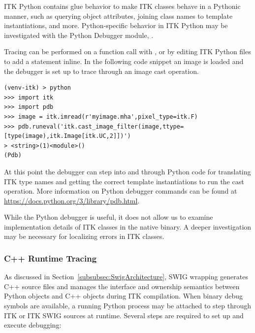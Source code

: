 ITK Python contains glue behavior to make ITK classes behave in a Pythonic manner,
such as querying object attributes, joining class names to template instantiations, and more.
Python-specific behavior in ITK Python may be investigated with the
Python Debugger module, .

Tracing can be performed on a function call with , or by editing ITK Python
files to add a  statement inline. In the following code snippet
an image is loaded and the debugger is set up to trace through an image cast operation.

\begin{verbatim}
(venv-itk) > python
>>> import itk
>>> import pdb
>>> image = itk.imread(r'myimage.mha',pixel_type=itk.F)
>>> pdb.runeval('itk.cast_image_filter(image,ttype=[type(image),itk.Image[itk.UC,2]])')
> <string>(1)<module>()
(Pdb)
\end{verbatim}

At this point the debugger can step into and through Python code for translating ITK
type names and getting the correct template instantiations to run the cast operation. More
information on Python debugger commands can be found at
\href{https://docs.python.org/3/library/pdb.html}{https://docs.python.org/3/library/pdb.html}.

While the Python debugger is useful, it does not allow us to examine implementation
details of ITK classes in the native binary. A deeper investigation may be necessary for localizing
errors in ITK classes.


\subsubsection{C++ Runtime Tracing}%
\label{subsubsec:CppRuntimeTracing}

As discussed in Section~\ref{subsubsec:SwigArchitecture}, SWIG wrapping generates
C++ source files and manages the interface and ownership semantics between
Python objects and C++ objects during ITK compilation.
When binary debug symbols are available, a running Python process may be attached to step through
ITK or ITK SWIG sources at runtime. Several steps are required to set up and execute debugging:

